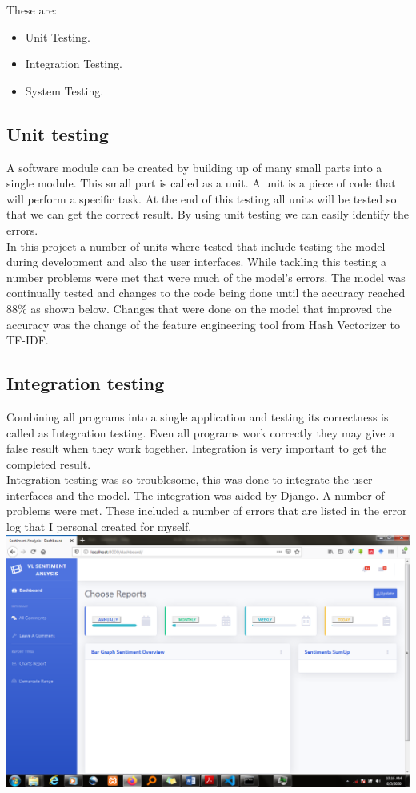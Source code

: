 \documentclass[12pt]{report}
\begin{document}
	These are:\\
	
	\begin{itemize}
		\item Unit Testing.
		\item Integration Testing.
		\item System Testing.
	\end{itemize}
	
	\subsection{Unit testing}
	A software module can be created by building up of many small parts into a single module. This small part is called as a unit. A unit is a piece of code that will perform a specific task. At the end of this testing all units will be tested so that we can get the correct result. By using unit testing we can easily identify the errors.\\
	
	In this project a number of units where tested that include testing the model during development and also the user interfaces. While tackling this testing a number problems were met that were much of the model’s errors. The model was continually tested and changes to the code being done until the accuracy reached 88\% as shown below. Changes that were done on the model that improved the accuracy was the change of the feature engineering tool from Hash Vectorizer to TF-IDF. \\
	
	\subsection{Integration testing}
	Combining all programs into a single application and testing its correctness is called as Integration testing. Even all programs work correctly they may give a false result when they work together. Integration is very important to get the completed result.\\
	
	Integration testing was so troublesome, this was done to integrate the user interfaces and the model. The integration was aided by Django. A number of problems were met. These included a number of errors that are listed in the error log that I personal created for myself.\\
	
	\includegraphics[scale=0.5]{admin.PNG}
	
\end{document}
